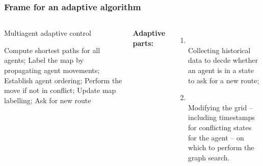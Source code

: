 \documentclass[12pt,aspectratio=169]{beamer}
\begin{document}
\begin{frame}[fragile,t]
  \frametitle{Frame for an adaptive algorithm}

{
\begin{columns}

\vspace*{-0cm}
\begin{minipage}{\linewidth}
  \begin{alertblock}{Multiagent adaptive control}
  \begin{algorithmic}[1]
  \State Compute shortest paths for \alert{all agents};
  \State Label the map by propagating agent movements;
  \State Establish agent ordering;
  \State Perform the move if not in conflict;
  \State Update map labelling;
  \State Ask for new route
  \EndIf
  \EndFor
  \EndWhile
  \end{algorithmic}
  \end{alertblock}
\end{minipage}

\vspace*{-0.5cm}

\textbf{Adaptive parts:}
\begin{enumerate}
\item {}\\
  Collecting historical data to decde whether an agent is in \alert{a state} to ask for a new route;\vspace*{.5cm}

\item {}\\
  Modifying the grid -- including timestamps for conflicting states for the agent -- on which to perform the graph search.
\end{enumerate}
\end{columns}

}
\end{frame}
\end{document}
